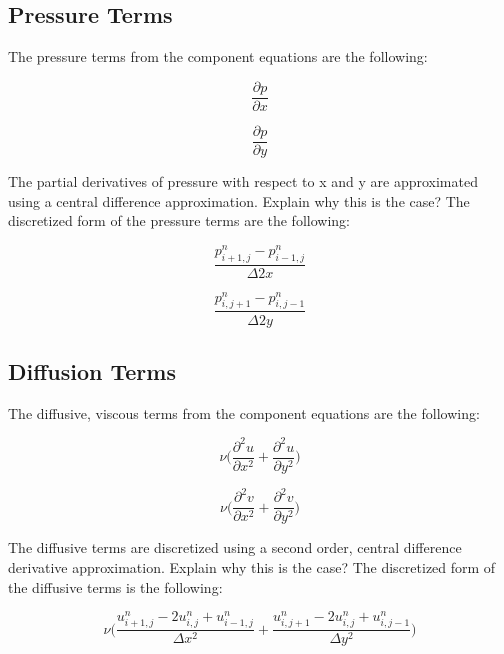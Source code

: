 \documentclass[twocolumn,12pth]{article}
\begin{document}
\subsection{Pressure Terms}

The pressure terms from the component equations are the following:

\begin{equation}
\frac{\partial{p}}{\partial{x}}
\end{equation}

\begin{equation*}
\frac{\partial{p}}{\partial{y}}
\end{equation*}

The partial derivatives of pressure with respect to x and y are approximated using a central difference approximation.
Explain why this is the case?
The discretized form of the pressure terms are the following:

\begin{equation}
\frac{p^n_{i+1,j} - p^n_{i-1,j}}{\Delta{2x}} 
\end{equation}

\begin{equation*}
\frac{p^n_{i,j+1} - p^n_{i,j-1}}{\Delta{2y}}
\end{equation*}

\subsection{Diffusion Terms}

The diffusive, viscous terms from the component equations are the following:

\begin{equation}
\nu \bigg( \frac{\partial^2u}{\partial{x}^2} + \frac{\partial^2u}{\partial{y}^2} \bigg)
\end{equation}

\begin{equation*}
\nu \bigg( \frac{\partial^2v}{\partial{x}^2} + \frac{\partial^2v}{\partial{y}^2} \bigg)
\end{equation*}

The diffusive terms are discretized using a second order, central difference derivative approximation.
Explain why this is the case?
The discretized form of the diffusive terms is the following:

\begin{equation}
\nu \Bigg( \frac{u^n_{i+1,j} -2u^n_{i,j} +  u^n_{i-1,j}}{\Delta{x^2}} + \frac{u^n_{i,j+1} -2u^n_{i,j} + u^n_{i,j-1}}{\Delta{y^2}} \Bigg)
\end{equation}
\end{document}

